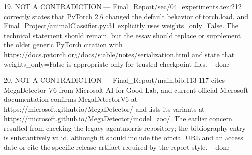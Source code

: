 19. NOT A CONTRADICTION — Final_Report/sec/04_experiments.tex:212 correctly states that PyTorch 2.6 changed the default behavior of torch.load, and Final_Project/animalClassifier.py:31 explicitly uses weights_only=False. The technical statement should remain, but the essay should replace or supplement the older generic PyTorch citation with https://docs.pytorch.org/docs/stable/notes/serialization.html and state that weights_only=False is appropriate only for trusted checkpoint files.
-- done

20. NOT A CONTRADICTION — Final_Report/main.bib:113-117 cites MegaDetector V6 from Microsoft AI for Good Lab, and current official Microsoft documentation confirms MegaDetectorV6 at https://microsoft.github.io/MegaDetector/ and lists its variants at https://microsoft.github.io/MegaDetector/model_zoo/. The earlier concern resulted from checking the legacy agentmorris repository; the bibliography entry is substantively valid, although it should include the official URL and an access date or cite the specific release artifact required by the report style.
-- done 
